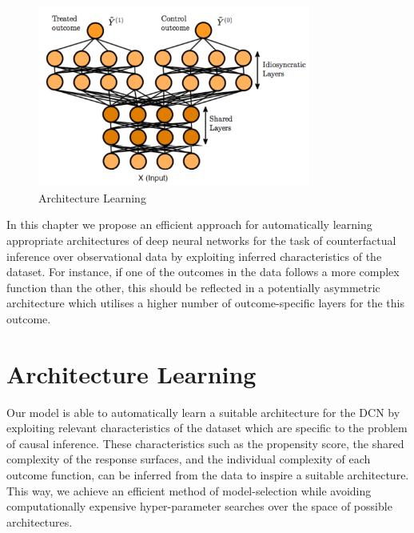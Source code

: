 \begin{figure}[h]
	\centering
	\includegraphics[width=0.8\textwidth]{figures/chapter-4/architecture-learning-motivation.png}
	\caption{Architecture Learning}\label{fig:architecture-learning-motivation}
\end{figure}

In this chapter we propose an efficient approach for automatically learning appropriate architectures of deep neural networks for the task of counterfactual inference over observational data by exploiting inferred characteristics of the dataset. For instance, if one of the outcomes in the data follows a more complex function than the other, this should be reflected in a potentially asymmetric architecture which utilises a higher number of outcome-specific layers for the this outcome.




\section{Architecture Learning}
Our model is able to automatically learn a suitable architecture for the DCN by exploiting relevant characteristics of the dataset which are specific to the problem of causal inference. These characteristics such as the propensity score, the shared complexity of the response surfaces, and the individual complexity of each outcome function, can be inferred from the data to inspire a suitable architecture. This way, we achieve an efficient method of model-selection while avoiding computationally expensive hyper-parameter searches over the space of possible architectures. 

